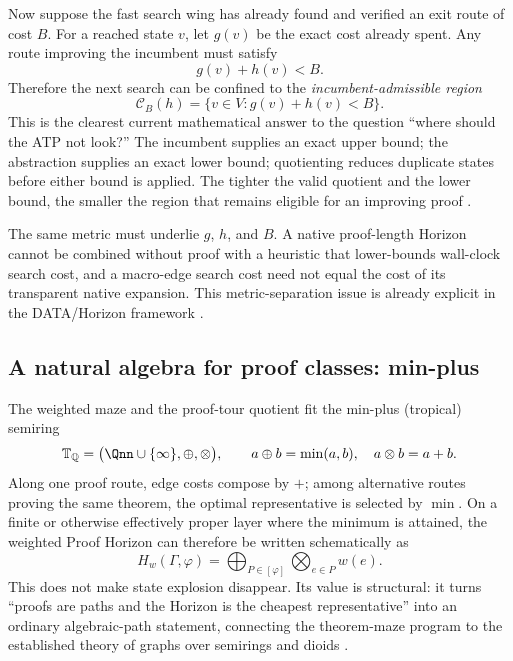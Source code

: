 Now suppose the fast search wing has already found and verified an exit route of cost $B$. For a reached state $v$, let $g(v)$ be the exact cost already spent. Any route improving the incumbent must satisfy
\[
g(v)+h(v)<B.
\]
Therefore the next search can be confined to the \emph{incumbent-admissible region}
\[
\boxed{
\mathcal C_B(h)=\{v\in V:g(v)+h(v)<B\}.
}
\]
This is the clearest current mathematical answer to the question ``where should the ATP not look?'' The incumbent supplies an exact upper bound; the abstraction supplies an exact lower bound; quotienting reduces duplicate states before either bound is applied. The tighter the valid quotient and the lower bound, the smaller the region that remains eligible for an improving proof \cite{astar,korffelner,horizon}.

\begin{caution}
The same metric must underlie $g$, $h$, and $B$. A native proof-length Horizon cannot be combined without proof with a heuristic that lower-bounds wall-clock search cost, and a macro-edge search cost need not equal the cost of its transparent native expansion. This metric-separation issue is already explicit in the DATA/Horizon framework \cite{data3}.
\end{caution}

\subsection{A natural algebra for proof classes: min-plus}
The weighted maze and the proof-tour quotient fit the min-plus (tropical) semiring
\[
\mathbb T_{\mathbb Q}
=\bigl(\Qnn\cup\{\infty\},\oplus,\otimes\bigr),
\qquad
a\oplus b=\min(a,b),\quad a\otimes b=a+b.
\]
Along one proof route, edge costs compose by $+$; among alternative routes proving the same theorem, the optimal representative is selected by $\min$. On a finite or otherwise effectively proper layer where the minimum is attained, the weighted Proof Horizon can therefore be written schematically as
\[
\boxed{
H_w(\Gamma,\varphi)
=
\bigoplus_{P\in[\varphi]}
\bigotimes_{e\in P} w(e).
}
\]
This does not make state explosion disappear. Its value is structural: it turns ``proofs are paths and the Horizon is the cheapest representative'' into an ordinary algebraic-path statement, connecting the theorem-maze program to the established theory of graphs over semirings and dioids \cite{gondranminoux}.

